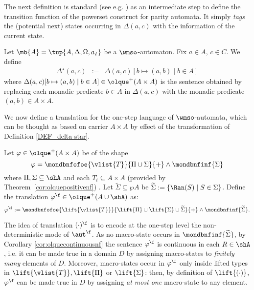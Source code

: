 The next definition is standard (see e.g.  \cite{Walukiewicz96,Ven08}) as an intermediate step to define the transition function of the powerset construct for parity automata. It simply \emph{tags} the (potential next) states occurring in $\Delta(a,c)$ with the information of the current state.

\begin{definition}\label{DEF_delta star} Let $\mb{A} = \tup{A,\Delta,\Omega,a_I}$ be a $\wmso$-automaton. Fix $a \in A$, $c \in C$. We define
\begin{eqnarray*}\Delta^{\star}(a,c) &:=& \Delta(a,c)[b \mapsto (a,b) \mid b \in A]     \end{eqnarray*}
where $\Delta(a,c)[b \mapsto (a,b) \mid b \in A] \in {\olque}^+(A\times A)$ is the sentence obtained by replacing each monadic predicate $b \in A$ in $\Delta(a,c)$ with the monadic predicate $(a,b) \in A \times A$.
\end{definition}

We now define a translation for the one-step language of $\wmso$-automata, which can be thought as based on carrier $A \times A$ by effect of the transformation of Definition \ref{DEF_delta star}.

\begin{definition}\label{DEF_finitary_lifting}
Let $\varphi \in {\olque}^+(A \times A)$ be of the shape
%
$$
\varphi = \mondbnfofoe{\vlist{T}}{\Pi \cup \Sigma}{+} \land
\mondbnfinf{\Sigma} %
$$
%
where $\Pi,\Sigma \subseteq \shA$ and each $T_i \subseteq A \times A$
(provided by Theorem~\ref{cor:olquepositivenf})%
. Let $\widetilde{\Sigma}\subseteq \wp A$ be $\widetilde{\Sigma} := \{\Ran(S) \mid S \in \Sigma\}$. Define the translation $\varphi^{\f} \in {\olque}^+(A \cup \shA )$ as:
$$
\varphi^\f := \mondbnfofoe{\lift{\vlist{T}}}{\lift{\Pi} \cup \lift{\Sigma} \cup \widetilde{\Sigma}}{+} \land
\mondbnfinf{\widetilde{\Sigma}} .
$$
\end{definition}

The idea of translation $(\cdot)^{\f}$ is to encode at the one-step level the non-deterministic mode of $\aut^{\f}$. As no macro-state occurs in $\mondbnfinf{\widetilde{\Sigma}}$,
by Corollary \ref{cor:olquecontinuousnf} the sentence $\varphi^{\f}$ is continuous in each $R\in \shA$, i.e. it can be made true in a domain $D$ by assigning macro-states to \emph{finitely many} elements of $D$. Moreover, macro-states occur in $\varphi^{\f}$ only inside lifted types in $\lift{\vlist{T}},\lift{\Pi}$ or $\lift{\Sigma}$: then, by definition of $\lift{(\cdot)}$, $\varphi^{\f}$ can be made true in $D$ by assigning \emph{at most one} macro-state to any element.

